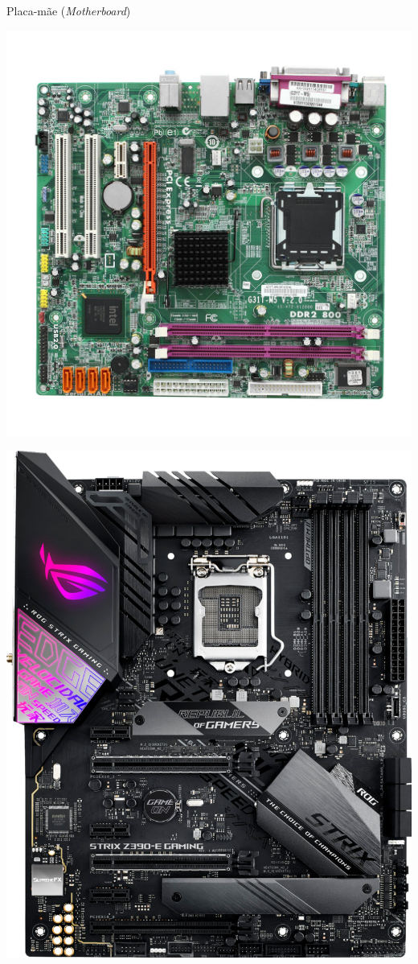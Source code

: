 \begin{frame}{Placa-mãe (\textit{Motherboard})}
	\begin{minipage}{0.49\linewidth}
		\centering
		\includegraphics[width=1\linewidth]{Figuras/Ch02/fig4}
	\end{minipage}\hfill
	\begin{minipage}{0.49\linewidth}
		\centering
		\includegraphics[width=1\linewidth]{Figuras/Ch02/fig5}
	\end{minipage}
\end{frame}


